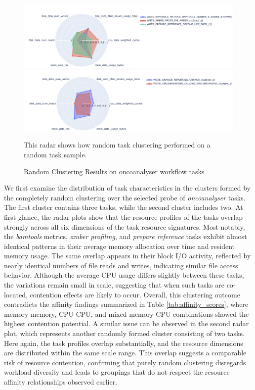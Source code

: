 \begin{figure}[H]
    \centering
    \includegraphics[scale=0.45]{fig/06/06-radarplot-random.png}
    \includegraphics[scale=0.45]{fig/06/06-radarplot-random-2.png}
    \small
    \caption{Random Clustering Results on oncoanalyser workflow tasks}
    \label{fig:radarplot_random}
    \tiny
    This radar shows how random task clustering performed on a random task sample.
\end{figure}

We first examine the distribution of task characteristics in the clusters formed by the completely random clustering over the selected probe of \textit{oncoanalyser} tasks. The first cluster contains three tasks, while the second cluster includes two. At first glance, the radar plots show that the resource profiles of the tasks overlap strongly across all six dimensions of the task resource signatures. Most notably, the \textit{bamtools} metrics, \textit{amber profiling}, and \textit{prepare reference} tasks exhibit almost identical patterns in their average memory allocation over time and resident memory usage. The same overlap appears in their block I/O activity, reflected by nearly identical numbers of file reads and writes, indicating similar file access behavior.
Although the average CPU usage differs slightly between these tasks, the variations remain small in scale, suggesting that when such tasks are co-located, contention effects are likely to occur. Overall, this clustering outcome contradicts the affinity findings summarized in Table \ref{tab:affinity_scores}, where memory-memory, CPU-CPU, and mixed memory-CPU combinations showed the highest contention potential.
A similar issue can be observed in the second radar plot, which represents another randomly formed cluster consisting of two tasks. Here again, the task profiles overlap substantially, and the resource dimensions are distributed within the same scale range. This overlap suggests a comparable risk of resource contention, confirming that purely random clustering disregards workload diversity and leads to groupings that do not respect the resource affinity relationships observed earlier.

